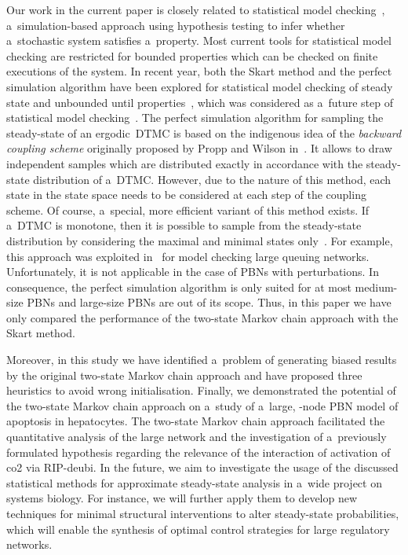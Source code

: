 \documentclass[runningheads,a4paper]{llncs}
\newcommand{\complex}[1]{{\fontfamily{lmss}\selectfont co#1}}
\newcommand{\node}[1]{{\fontfamily{lmss}\selectfont #1}}
\begin{document}
Our work in the current paper is closely related to statistical model checking~\cite{YS02,SVA05},
a~simulation-based approach using hypothesis testing to infer whether a~stochastic system
satisfies a~property. Most current tools for statistical model checking are restricted for bounded
properties which can be checked on finite executions of the system. In recent year, both the Skart
method and the perfect simulation algorithm have been explored for statistical model checking of
steady state and unbounded until properties~\cite{RP09,Roh13}, which was considered as a~future
step of statistical model checking~\cite{LDB10}. The perfect simulation algorithm for sampling the
steady-state of an ergodic~DTMC is based on the indigenous idea of the \emph{backward coupling
scheme} originally proposed by Propp and Wilson in~\cite{PW96}. It allows to draw independent
samples which are distributed exactly in accordance with the steady-state distribution of a~DTMC.
However, due to the nature of this method, each state in the state space needs to be considered at
each step of the coupling scheme. Of course, a~special, more efficient variant of this method
exists. If a~DTMC is monotone, then it is possible to sample from the steady-state distribution
by considering the maximal and minimal states only~\cite{PW96,BGV08}. For example, this approach
was exploited in~\cite{RP09} for model checking large queuing networks. Unfortunately, it is not
applicable in the case of PBNs with perturbations. In consequence, the perfect simulation
algorithm is only suited for at most medium-size PBNs and large-size PBNs are out of its scope.
Thus, in this paper we have only compared the performance of the two-state Markov chain approach
with the Skart method.

Moreover, in this study we have identified a~problem of generating biased results by the original
two-state Markov chain approach and have proposed three heuristics to avoid wrong initialisation.
Finally, we demonstrated the potential of the two-state Markov chain approach on a~study of
a~large, -node PBN model of apoptosis in hepatocytes. The two-state Markov chain approach
facilitated the quantitative analysis of the large network and the investigation of a~previously
formulated hypothesis regarding the relevance of the interaction of activation of \complex{2} via
\node{RIP-deubi}. In the future, we aim to investigate the usage of the discussed statistical
methods for approximate steady-state analysis in a~wide project on systems biology. For instance,
we will further apply them to develop new techniques for minimal structural interventions to alter
steady-state probabilities, which will enable the synthesis of optimal control strategies for
large regulatory networks.
\end{document}
